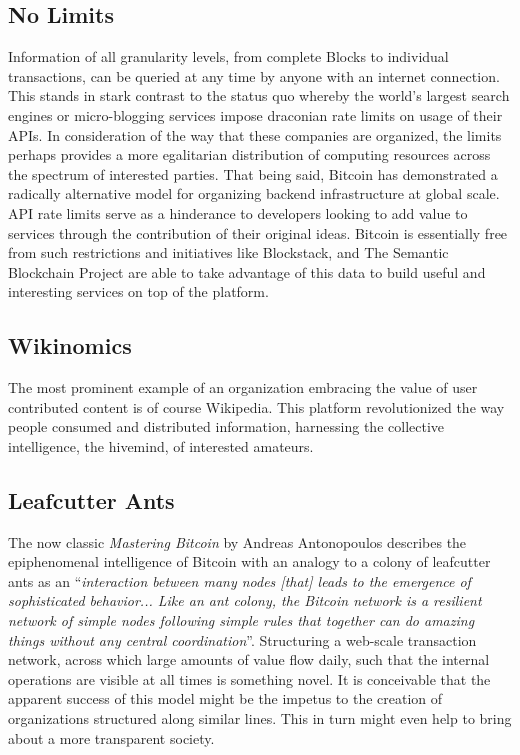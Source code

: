 \subsection*{No Limits}

Information of all granularity levels, from complete Blocks to individual transactions, can be queried at any time by anyone with an internet connection. 
This stands in stark contrast to the status quo whereby the world's largest search engines or micro-blogging services impose draconian rate limits on usage of their APIs. 
In consideration of the way that these companies are organized, the limits perhaps provides a more egalitarian distribution of computing resources across the spectrum of interested parties. 
That being said, Bitcoin has demonstrated a radically alternative model for organizing backend infrastructure at global scale. 
API rate limits serve as a hinderance to developers looking to add value to services through the contribution of their original ideas. 
Bitcoin is essentially free from such restrictions and initiatives like Blockstack, and
The Semantic Blockchain Project are able to take advantage of this data to build useful and interesting services on top of the platform.

\subsection*{Wikinomics}

The most prominent example of an organization embracing the value of user contributed content is of course Wikipedia. 
This platform revolutionized the way people consumed and distributed information, harnessing the collective intelligence, the hivemind, of interested amateurs.

\subsection*{Leafcutter Ants}

The now classic \textit{Mastering Bitcoin} by Andreas Antonopoulos describes the epiphenomenal intelligence of Bitcoin with an analogy to a colony of leafcutter ants as an ``\textit{interaction between many nodes [that] leads to the emergence of sophisticated behavior... Like an ant colony, the Bitcoin network is a resilient network of simple nodes following simple rules that together can do amazing things without any central coordination}''. Structuring a web-scale transaction network, across which large amounts of value flow daily, such that the internal operations are visible at all times is something novel. 
It is conceivable that the apparent success of this model might be the impetus to the creation of organizations structured along similar lines. 
This in turn might even help to bring about a more transparent society.

